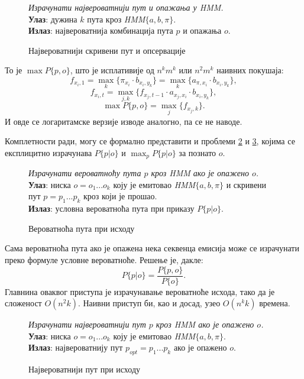 \documentclass[12pt,oneside]{memoir}
\newenvironment{problem}[1][!ht]
{\renewcommand{\algorithmcfname}{Проблем}
\begin{figure}[!ht]
\centering
  \begin{minipage}{.94\linewidth}
	\begin{algorithm}[#1]%
  }{\end{algorithm}
  \end{minipage}
\end{figure}}
\begin{document}
\begin{CJK}{UTF8}{ipxm}
\begin{problem}[H]
  \SetAlgoLined
  \textit{Израчунати највероватнији пут и опажања у \textit{HMM}.}\\
  \textbf{Улаз}: дужина $k$ пута кроз \textit{HMM}$\{a, b, \pi\}$.\\
  \textbf{Излаз}: највероватнија комбинација пута $p$ и опажања $o$.
  \caption{Највероватнији скривени пут и опсервације}
  \label{prob:maxpo}
\end{problem}

То је $\max P\{p, o\}$, што је исплативије од $n^k m^k$ или $n^2 m^k$ наивних покушаја: $$f_{x_i, 1} = \max_k \{\pi_{x_i} \cdot b_{x_i, y_k}\} = \max_k \{a_{\pi, x_i} \cdot b_{x_i, y_k}\},$$ $$f_{x_i, t} = \max_{j, k} \{f_{x_j, t-1} \cdot a_{x_j, x_i} \cdot b_{x_i, y_k}\},$$ $$\max P\{p, o\} = \max_j \{f_{x_j, k}\}.$$ И овде се логаритамске верзије изводе аналогно, па се не наводе.

Комплетности ради, могу се формално представити и проблеми \ref{prob:putpri} и \ref{prob:maxputpri}, којима се експлицитно израчунава $P\{p | o\}$ и $\max_p P\{p | o\}$ за познато $o$.

\begin{problem}[H]
  \SetAlgoLined
  \textit{Израчунати вероватноћу пута $p$ кроз \textit{HMM} ако је опажено $o$.}\\
  \textbf{Улаз}: ниска $o = o_1...o_k$ коју је емитовао \textit{HMM}$\{a, b, \pi\}$ и скривени пут $p = p_1...p_k$ кроз који је прошао.\\
  \textbf{Излаз}: условна вероватноћа пута при приказу $P\{p | o\}$.
  \caption{Вероватноћа пута при исходу}
  \label{prob:putpri}
\end{problem}

Сама вероватноћа пута ако је опажена нека секвенца емисија може се израчунати преко формуле условне вероватноће. Решење је, дакле: $$P\{p | o\} = \frac{P\{p, o\}}{P\{o\}}.$$ Главнина оваквог приступа је израчунавање вероватноће исхода, тако да је сложеност $O(n^2 k)$. Наивни приступ би, као и досад, узео $O(n^k k)$ времена.

\begin{problem}[H]
  \SetAlgoLined
  \textit{Израчунати највероватнији пут $p$ кроз \textit{HMM} ако је опажено $o$.}\\
  \textbf{Улаз}: ниска $o = o_1...o_k$ коју је емитовао \textit{HMM}$\{a, b, \pi\}$.\\
  \textbf{Излаз}: највероватнију пут $p_{opt} = p_1...p_k$ ако је опажено $o$.
  \caption{Највероватнији пут при исходу}
  \label{prob:maxputpri}
\end{problem}


\end{CJK}
\end{document}

